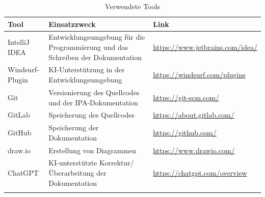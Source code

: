 \renewcommand{\arraystretch}{1.5}
\begin{longtable}{|p{}|p{}|p{}|}
    \hline
    \textbf{Tool} & \textbf{Einsatzzweck} & \textbf{Link} \\ \hline
    IntelliJ IDEA & Entwicklungsumgebung für die Programmierung und das Schreiben der Dokumentation & \url{https://www.jetbrains.com/idea/} \\ \hline
    Windsurf-Plugin & KI-Unterstützung in der Entwicklungsumgebung & \url{https://windsurf.com/plugins} \\ \hline
    Git & Versionierung des Quellcodes und der IPA-Dokumentation & \url{https://git-scm.com/} \\ \hline
    GitLab & Speicherung des Quellcodes & \url{https://about.gitlab.com/} \\ \hline
    GitHub & Speicherung der Dokumentation & \url{https://github.com/} \\ \hline
    draw.io & Erstellung von Diagrammen & \url{https://www.drawio.com/} \\ \hline
    ChatGPT & KI-unterstützte Korrektur/Überarbeitung der Dokumentation & \url{https://chatgpt.com/overview} \\ \hline
    \caption{Verwendete Tools}\label{tab:used-tools}
\end{longtable}
\renewcommand{\arraystretch}{1}
\newpage
